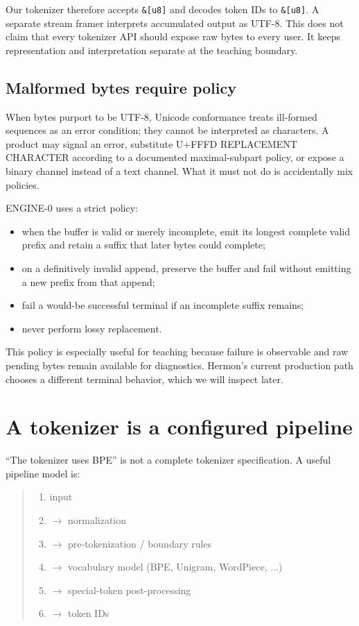 Our  tokenizer therefore accepts \texttt{\&{[}u8{]}} and
decodes token IDs to \texttt{\&{[}u8{]}}. A separate stream framer
interprets accumulated output as UTF-8. This does not claim that every
tokenizer API should expose raw bytes to every user. It keeps
representation and interpretation separate at the teaching boundary.

\subsection{Malformed bytes require
policy}\label{malformed-bytes-require-policy}

When bytes purport to be UTF-8, Unicode conformance treats ill-formed
sequences as an error condition; they cannot be interpreted as
characters. A product may signal an error, substitute U+FFFD REPLACEMENT
CHARACTER according to a documented maximal-subpart policy, or expose a
binary channel instead of a text channel. What it must not do is
accidentally mix policies.

ENGINE-0 uses a strict policy:

\begin{itemize}
\tightlist
\item
  when the buffer is valid or merely incomplete, emit its longest
  complete valid prefix and retain a suffix that later bytes could
  complete;
\item
  on a definitively invalid append, preserve the buffer and fail without
  emitting a new prefix from that append;
\item
  fail a would-be successful terminal if an incomplete suffix remains;
\item
  never perform lossy replacement.
\end{itemize}

This policy is especially useful for teaching because failure is
observable and raw pending bytes remain available for diagnostics.
Hermon's current production path chooses a different terminal behavior,
which we will inspect later.

\section{A tokenizer is a configured
pipeline}\label{a-tokenizer-is-a-configured-pipeline}

``The tokenizer uses BPE'' is not a complete tokenizer specification. A
useful pipeline model is:

\begin{quote}
\begin{enumerate}
\item input
\item \(\longrightarrow\)  normalization
\item \(\longrightarrow\)  pre-tokenization / boundary rules
\item \(\longrightarrow\)  vocabulary model (BPE, Unigram, WordPiece, ...)
\item \(\longrightarrow\)  special-token post-processing
\item \(\longrightarrow\)  token IDs
\end{enumerate}
\end{quote}

